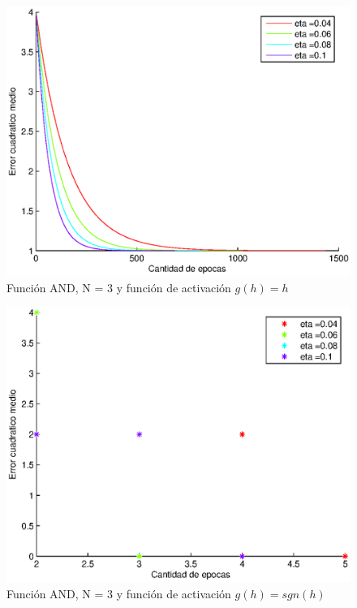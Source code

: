 \documentclass{sig-alternate}
\begin{document}
\begin{figure}[!ht]
	\includegraphics[scale=0.5]{images/PuriAnd/AND_N3_err001_lineal__error.eps}
  \caption{Funci\'on AND, N = 3 y funci\'on de activaci\'on $g(h) = h$}
  \label{fig:lineal}
\end{figure}

\begin{figure}[!ht]
	\includegraphics[scale=0.5]{images/PuriAnd/AND_N3_err001_step.eps}
  \caption{Funci\'on AND, N = 3 y funci\'on de activaci\'on $g(h) = sgn(h)$}
  \label{fig:step}
\end{figure}
\end{document}
